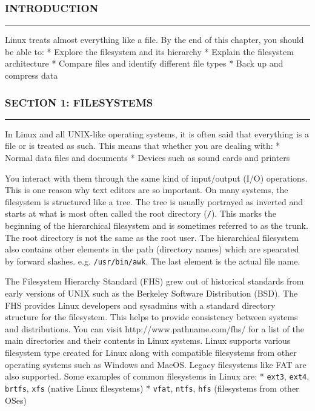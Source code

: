 \subsubsection{INTRODUCTION}\label{introduction-7}

\begin{center}\rule{3in}{0.4pt}\end{center}

Linux treats almost everything like a file. By the end of this chapter,
you should be able to: * Explore the filesystem and its hierarchy *
Explain the filesystem architecture * Compare files and identify
different file types * Back up and compress data

\subsubsection{SECTION 1: FILESYSTEMS}\label{section-1-filesystems}

\begin{center}\rule{3in}{0.4pt}\end{center}

In Linux and all UNIX-like operating systems, it is often said that
everything is a file or is treated as such. This means that whether you
are dealing with: * Normal data files and documents * Devices such as
sound cards and printers

You interact with them through the same kind of input/output (I/O)
operations. This is one reason why text editors are so important. On
many systems, the filesystem is structured like a tree. The tree is
usually portrayed as inverted and starts at what is most often called
the root directory (\texttt{/}). This marks the beginning of the
hierarchical filesystem and is sometimes referred to as the trunk. The
root directory is not the same as the root user. The hierarchical
filesystem also contains other elements in the path (directory names)
which are spearated by forward slashes. e.g. \texttt{/usr/bin/awk}. The
last element is the actual file name.

The Filesystem Hierarchy Standard (FHS) grew out of historical standards
from early versions of UNIX such as the Berkeley Software Distribution
(BSD). The FHS provides Linux developers and sysadmins with a standard
directory structure for the filesystem. This helps to provide
consistency between systems and distributions. You can visit
http://www.pathname.com/fhs/ for a list of the main directories and
their contents in Linux systems. Linux supports various filesystem type
created for Linux along with compatible filesystems from other operating
systems such as Windows and MacOS. Legacy filesystems like FAT are also
supported. Some examples of common filesystems in Linux are: *
\texttt{ext3}, \texttt{ext4}, \texttt{brtfs}, \texttt{xfs} (native Linux
filesystems) * \texttt{vfat}, \texttt{ntfs}, \texttt{hfs} (filesystems
from other OSes)

